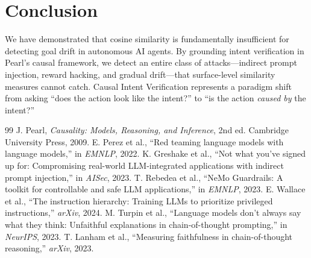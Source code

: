 \documentclass{article}
\begin{document}
\section{Conclusion}

We have demonstrated that cosine similarity is fundamentally insufficient for detecting goal drift in autonomous AI agents. By grounding intent verification in Pearl's causal framework, we detect an entire class of attacks---indirect prompt injection, reward hacking, and gradual drift---that surface-level similarity measures cannot catch. Causal Intent Verification represents a paradigm shift from asking ``does the action look like the intent?'' to ``is the action \textit{caused by} the intent?''

\begin{thebibliography}{99}
 J. Pearl, \textit{Causality: Models, Reasoning, and Inference}, 2nd ed. Cambridge University Press, 2009.
 E. Perez et al., ``Red teaming language models with language models,'' in \textit{EMNLP}, 2022.
 K. Greshake et al., ``Not what you've signed up for: Compromising real-world LLM-integrated applications with indirect prompt injection,'' in \textit{AISec}, 2023.
 T. Rebedea et al., ``NeMo Guardrails: A toolkit for controllable and safe LLM applications,'' in \textit{EMNLP}, 2023.
 E. Wallace et al., ``The instruction hierarchy: Training LLMs to prioritize privileged instructions,'' \textit{arXiv}, 2024.
 M. Turpin et al., ``Language models don't always say what they think: Unfaithful explanations in chain-of-thought prompting,'' in \textit{NeurIPS}, 2023.
 T. Lanham et al., ``Measuring faithfulness in chain-of-thought reasoning,'' \textit{arXiv}, 2023.
\end{thebibliography}
\end{document}
